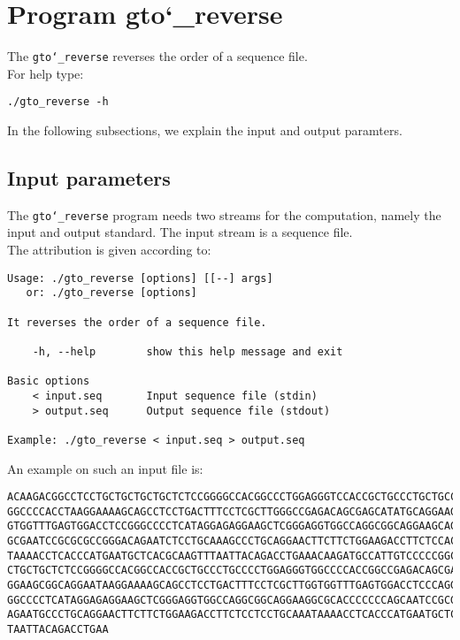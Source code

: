 \section{Program gto\char`_reverse}
The \texttt{gto\char`_reverse} reverses the order of a sequence file.\\
For help type:
\begin{lstlisting}
./gto_reverse -h
\end{lstlisting}
In the following subsections, we explain the input and output paramters.

\subsection*{Input parameters}

The \texttt{gto\char`_reverse} program needs two streams for the computation, namely the input and output standard. The input stream is a sequence file.\\
The attribution is given according to:
\begin{lstlisting}
Usage: ./gto_reverse [options] [[--] args]
   or: ./gto_reverse [options]

It reverses the order of a sequence file.

    -h, --help        show this help message and exit

Basic options
    < input.seq       Input sequence file (stdin)
    > output.seq      Output sequence file (stdout)

Example: ./gto_reverse < input.seq > output.seq
\end{lstlisting}
An example on such an input file is:
\begin{lstlisting}
ACAAGACGGCCTCCTGCTGCTGCTGCTCTCCGGGGCCACGGCCCTGGAGGGTCCACCGCTGCCCTGCTGCCATTGTCCCC
GGCCCCACCTAAGGAAAAGCAGCCTCCTGACTTTCCTCGCTTGGGCCGAGACAGCGAGCATATGCAGGAAGCGGCAGGAA
GTGGTTTGAGTGGACCTCCGGGCCCCTCATAGGAGAGGAAGCTCGGGAGGTGGCCAGGCGGCAGGAAGCAGGCCAGTGCC
GCGAATCCGCGCGCCGGGACAGAATCTCCTGCAAAGCCCTGCAGGAACTTCTTCTGGAAGACCTTCTCCACCCCCCCAGC
TAAAACCTCACCCATGAATGCTCACGCAAGTTTAATTACAGACCTGAAACAAGATGCCATTGTCCCCCGGCCTCCTGCTG
CTGCTGCTCTCCGGGGCCACGGCCACCGCTGCCCTGCCCCTGGAGGGTGGCCCCACCGGCCGAGACAGCGAGCATATGCA
GGAAGCGGCAGGAATAAGGAAAAGCAGCCTCCTGACTTTCCTCGCTTGGTGGTTTGAGTGGACCTCCCAGGCCAGTGCCG
GGCCCCTCATAGGAGAGGAAGCTCGGGAGGTGGCCAGGCGGCAGGAAGGCGCACCCCCCCAGCAATCCGCGCGCCGGGAC
AGAATGCCCTGCAGGAACTTCTTCTGGAAGACCTTCTCCTCCTGCAAATAAAACCTCACCCATGAATGCTCACGCAAGTT
TAATTACAGACCTGAA
\end{lstlisting}

